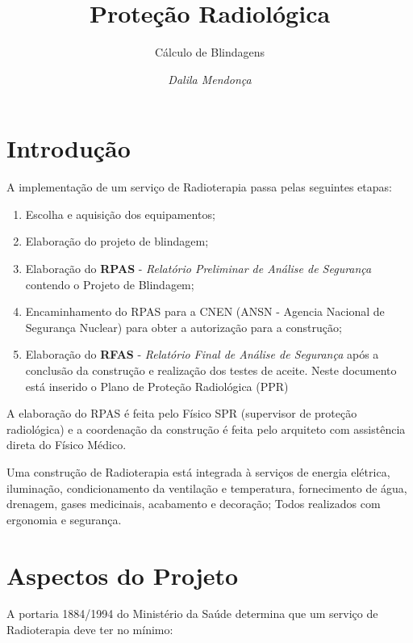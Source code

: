 \documentclass[11pt,a4paper]{article}
\title{\LobsterTwo\Huge{Proteção Radiológica}}
\author{\LobsterTwo\Large{Cálculo de Blindagens}\nocite{*}}
\date{\LobsterTwo\textit{Dalila Mendonça}}
\begin{document}
	\maketitle

    \section{Introdução}

    A implementação de um serviço de Radioterapia passa pelas seguintes etapas:

    \begin{enumerate}
        \item Escolha e aquisição dos equipamentos;
        \item Elaboração do projeto de blindagem;
        \item Elaboração do \textcolor{CarnationPink}{\textbf{RPAS} - \textit{Relatório Preliminar de Análise de Segurança}} contendo o Projeto de Blindagem;
        \item Encaminhamento do RPAS para a CNEN (ANSN - Agencia Nacional de Segurança Nuclear) para obter a autorização para a construção;
        \item  Elaboração do \textcolor{CarnationPink}{\textbf{RFAS} - \textit{Relatório Final de Análise de Segurança}} após a conclusão da construção e realização dos testes de aceite. Neste documento está inserido o Plano de Proteção Radiológica (PPR)
    \end{enumerate}

    A elaboração do RPAS é feita pelo Físico SPR (supervisor de proteção radiológica) e a coordenação da construção é feita pelo arquiteto com assistência direta do Físico Médico.

    Uma construção de Radioterapia está integrada à serviços de energia elétrica, iluminação, condicionamento da ventilação e temperatura, fornecimento de água, drenagem, gases medicinais, acabamento e decoração; Todos realizados com ergonomia e segurança.

    \section{Aspectos do Projeto}

        A portaria 1884/1994 do Ministério da Saúde determina que um serviço de Radioterapia deve ter no mínimo:
\end{document}

